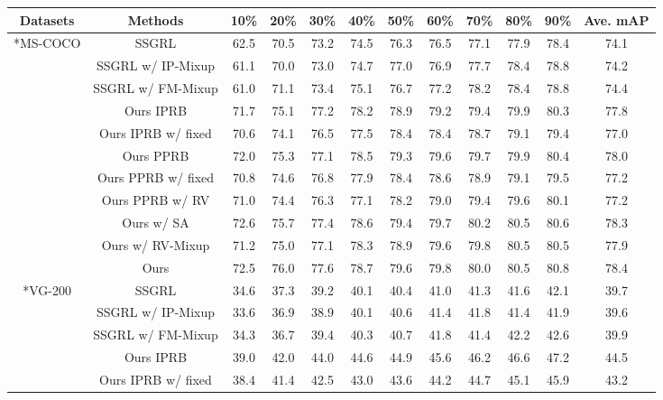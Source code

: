\documentclass[lettersize,journal]{IEEEtran}
\begin{document}
\begin{table*}
  \centering
  \small
  \begin{tabular}{c|c|ccccccccc|c}
  \hline
  \centering Datasets & Methods & 10\% & 20\% & 30\% & 40\% & 50\% & 60\% & 70\% & 80\% & 90\% & Ave. mAP \\
  \hline
  \hline
  \centering \multirow{10}*{MS-COCO} & SSGRL & 62.5 & 70.5 & 73.2 & 74.5 & 76.3 & 76.5 & 77.1 & 77.9 & 78.4 & 74.1 \\
  \centering ~ & SSGRL w/ IP-Mixup & 61.1 & 70.0 & 73.0 & 74.7 & 77.0 & 76.9 & 77.7 & 78.4 & 78.8 & 74.2 \\
  \centering ~ & SSGRL w/ FM-Mixup & 61.0 & 71.1 & 73.4 & 75.1 & 76.7 & 77.2 & 78.2 & 78.4 & 78.8 & 74.4 \\
  \centering ~ & Ours IPRB & 71.7 & 75.1 & 77.2 & 78.2 & 78.9 & 79.2 & 79.4 & 79.9 & 80.3 & 77.8 \\
  \centering ~ & Ours IPRB w/ fixed  & 70.6 & 74.1 & 76.5 & 77.5 & 78.4 & 78.4 & 78.7 & 79.1 & 79.4 & 77.0 \\
  \centering ~ & Ours PPRB & 72.0 & 75.3 & 77.1 & 78.5 & 79.3 & 79.6 & 79.7 & 79.9 & 80.4 & 78.0 \\
  \centering ~ & Ours PPRB w/ fixed  & 70.8 & 74.6 & 76.8 & 77.9 & 78.4 & 78.6 & 78.9 & 79.1 & 79.5 & 77.2 \\
  \centering ~ & Ours PPRB w/ RV & 71.0 & 74.4 & 76.3 & 77.1 & 78.2 & 79.0 & 79.4 & 79.6 & 80.1 & 77.2 \\
  \centering ~ & Ours w/ SA & 72.6 & 75.7 & 77.4 & 78.6 & 79.4 & 79.7 & 80.2 & 80.5 & 80.6 & 78.3 \\
  \centering ~ & Ours w/ RV-Mixup & 71.2 & 75.0 & 77.1 & 78.3 & 78.9 & 79.6 & 79.8 & 80.5 & 80.5 & 77.9 \\
  \centering ~ & Ours & 72.5 & 76.0 & 77.6 & 78.7 & 79.6 & 79.8 & 80.0 & 80.5 & 80.8 & 78.4 \\
  \hline
  \hline
  \centering \multirow{10}*{VG-200} & SSGRL & 34.6 & 37.3 & 39.2 & 40.1 & 40.4 & 41.0 & 41.3 & 41.6 & 42.1 & 39.7 \\
   \centering ~ & SSGRL w/ IP-Mixup & 33.6 & 36.9 & 38.9 & 40.1 & 40.6 & 41.4 & 41.8 & 41.4 & 41.9 & 39.6 \\
  \centering ~ & SSGRL w/ FM-Mixup & 34.3 & 36.7 & 39.4 & 40.3 & 40.7 & 41.8 & 41.4 & 42.2 & 42.6 & 39.9 \\
  \centering ~ & Ours IPRB & 39.0 & 42.0 & 44.0 & 44.6 & 44.9 & 45.6 & 46.2 & 46.6 & 47.2 & 44.5 \\
  \centering ~ & Ours IPRB w/ fixed  & 38.4 & 41.4 & 42.5 & 43.0 & 43.6 & 44.2 & 44.7 & 45.1 & 45.9 & 43.2 \\

\end{tabular}
\end{table*}
\end{document}
